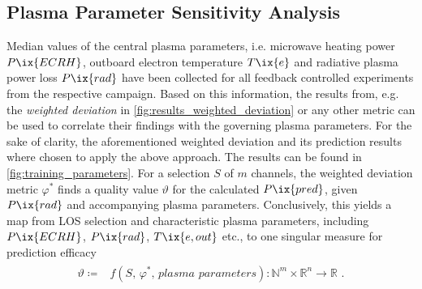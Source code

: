         \subsection{Plasma Parameter Sensitivity Analysis}\label{sec:senseresults}%
%
            Median values of the central plasma parameters, i.e. microwave heating power $P\ix{ECRH}$, outboard electron temperature $T\ix{e}$ and radiative plasma power loss $P\ix{rad}$ have been collected for all feedback controlled experiments from the respective campaign. Based on this information, the results from, e.g. the \textit{weighted deviation} in \cref{fig:results_weighted_deviation} or any other metric can be used to correlate their findings with the governing plasma parameters. For the sake of clarity, the aforementioned weighted deviation and its prediction results where chosen to apply the above approach. The results can be found in \cref{fig:training_parameters}. For a selection $S$ of $m$ channels, the weighted deviation metric $\varphi^{\ast}$ finds a quality value $\vartheta$ for the calculated $P\ix{pred}$, given $P\ix{rad}$ and accompanying plasma parameters. Conclusively, this yields a map from LOS selection and characteristic plasma parameters, including $P\ix{ECRH}$, $P\ix{rad}$, $T\ix{e,out}$ etc., to one singular measure for prediction efficacy%
%
            \begin{align}%
                \begin{split}\label{eq:sensitivity_parameter_map}%
                    \vartheta\coloneqq &f\left(S,\,\varphi^{\ast},\,\textit{plasma parameters}\right)\colon\mathbb{N}^{m}\times\mathbb{R}^{n}\to\mathbb{R}\,\,.%
                \end{split}%
            \end{align}%
%
